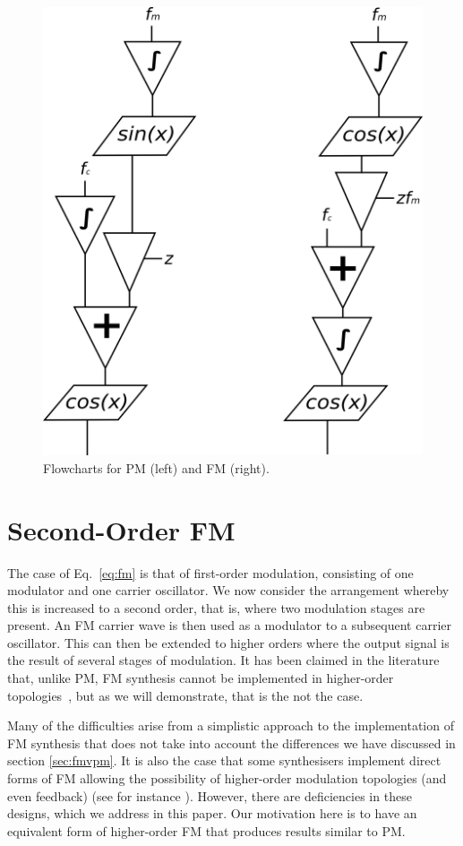 \documentclass[]{interact}
\begin{document}
\begin{figure}[htp]
\begin{center}
\includegraphics[width=.5\columnwidth]{fmpm.png}
\caption{Flowcharts for PM (left) and FM (right).}
\label{fig:fmpm}
\end{center}
\end{figure} 

\section{Second-Order FM}\label{sec:theory}

 The case of Eq.~\ref{eq:fm} is that of first-order modulation,
consisting of one modulator and one carrier oscillator. We now consider the arrangement whereby this is increased
to a second order, that is, where two modulation stages are present. An FM carrier wave is then 
used as a modulator to a subsequent carrier oscillator. This can then be extended to higher orders
where the output signal is the result of several stages of modulation. It has been claimed in the literature
that, unlike PM, FM synthesis cannot be implemented in higher-order topologies~\citep{PinkstonFM}, but
as we will demonstrate, that is the not the case. 

Many of the difficulties arise from a simplistic approach
to the implementation of FM synthesis that does not take into account the differences we have discussed
in section \ref{sec:fmvpm}. It is also the case that some synthesisers implement direct forms of FM allowing 
the possibility of higher-order modulation topologies (and even feedback) (see for instance \cite{Summit}). 
However, there are deficiencies in these designs, which we address in this paper. Our motivation here is
to have an equivalent form of higher-order FM that produces results similar to PM. 
\end{document}
